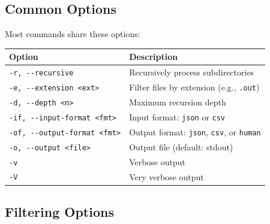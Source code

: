 \documentclass[
]{book}
\begin{document}
\subsection{Common Options}\label{common-options}

Most commands share these options:

{\def\LTcaptype{} %
\begin{longtable}[]{@{}
  >{\raggedright\arraybackslash}p{}
  >{\raggedright\arraybackslash}p{}@{}}
\toprule\noalign{}
\begin{minipage}[b]{\linewidth}\raggedright
Option
\end{minipage} & \begin{minipage}[b]{\linewidth}\raggedright
Description
\end{minipage} \\
\midrule\noalign{}
\endhead
\bottomrule\noalign{}
\endlastfoot
\texttt{-r,\ -\/-recursive} & Recursively process subdirectories \\
\texttt{-e,\ -\/-extension\ \textless{}ext\textgreater{}} & Filter files by extension (e.g., \texttt{.out}) \\
\texttt{-d,\ -\/-depth\ \textless{}n\textgreater{}} & Maximum recursion depth \\
\texttt{-if,\ -\/-input-format\ \textless{}fmt\textgreater{}} & Input format: \texttt{json} or \texttt{csv} \\
\texttt{-of,\ -\/-output-format\ \textless{}fmt\textgreater{}} & Output format: \texttt{json}, \texttt{csv}, or \texttt{human} \\
\texttt{-o,\ -\/-output\ \textless{}file\textgreater{}} & Output file (default: stdout) \\
\texttt{-v} & Verbose output \\
\texttt{-V} & Very verbose output \\
\end{longtable}
}

\subsection{Filtering Options}\label{filtering-options}
\end{document}
